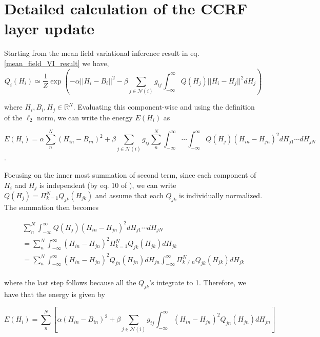 



\section*{Detailed calculation of the CCRF layer update}
Starting from the mean field variational inference result in eq. \ref{mean_field_VI_result} we have, %
\label{crf_detailed}
\begin{equation}
Q_i (H_i) \simeq \frac{1}{Z} \exp \left ( - \alpha || H_i - B_i ||^2  - \beta \sum_{j \in \mathcal{N}(i)} g_{ij} \int_{-\infty}^{\infty} Q(H_j) ||H_i - H_j ||^2 d H_j\right )
\end{equation}

where $H_i, B_i, H_j \in \mathbb{R}^N$. Evaluating this component-wise and using the definition of the $\ell_2$ norm, we can write the energy $E(H_i)$ as

\begin{equation}
E(H_i) = \alpha \sum_n^N (H_{in} - B_{in})^2 + \beta \sum_{j \in \mathcal{N}(i)} g_{ij} \sum_n^N \int_{-\infty}^{\infty} \cdots \int_{-\infty}^{\infty} Q(H_j) (H_{in} - H_{jn})^2 d H_{j1}\cdots dH_{jN}
\end{equation}.

Focusing on the inner most summation of second term, since each component of $H_i$ and $H_j$ is
independent (by eq. 10 of \citet{gao2019conditional}), we can write $Q(H_j) = \Pi_{k=1}^N Q_{jk}(H_{jk})$ and assume that each $Q_{jk}$ is individually normalized. The summation then becomes

\begin{multline}
 \sum_n^N \int_{-\infty}^{\infty}  Q(H_j) (H_{in} - H_{jn})^2 d H_{j1}\cdots dH_{jN} \\
= \sum_n^N \int_{-\infty}^{\infty} (H_{in} - H_{jn})^2  \Pi_{k=1}^N Q_{jk}(H_{jk}) d H_{jk} \\
= \sum_n^N \int_{-\infty}^{\infty} (H_{in} - H_{jn})^2  Q_{jn}(H_{jn}) d H_{jn}\int_{-\infty}^{\infty}  \Pi_{k\neq n}^N Q_{jk}(H_{jk}) d H_{jk} \\
\end{multline} 

where the last step follows because all the $Q_{jk}$'s integrate to 1. Therefore, we have that the energy is given by

\begin{equation}
E(H_i) = \sum_n^N \left [ \alpha (H_{in} - B_{in})^2 + \beta \sum_{j \in \mathcal{N}(i)} g_{ij}  \int_{-\infty}^{\infty} (H_{in} - H_{jn})^2  Q_{jn}(H_{jn}) d H_{jn} \right ]
\end{equation}

